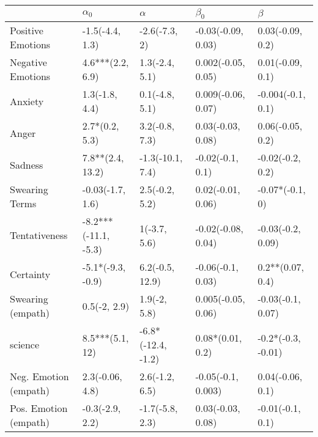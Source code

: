 \begin{tabular}{lllll}
\toprule
{} &            $\alpha_0$ &            $\alpha$ &           $\beta_0$ &             $\beta$ \\
\midrule
Positive Emotions     &       -1.5(-4.4, 1.3) &       -2.6(-7.3, 2) &  -0.03(-0.09, 0.03) &    0.03(-0.09, 0.2) \\
Negative Emotions     &      4.6***(2.2, 6.9) &      1.3(-2.4, 5.1) &  0.002(-0.05, 0.05) &    0.01(-0.09, 0.1) \\
Anxiety               &        1.3(-1.8, 4.4) &      0.1(-4.8, 5.1) &  0.009(-0.06, 0.07) &   -0.004(-0.1, 0.1) \\
Anger                 &        2.7*(0.2, 5.3) &      3.2(-0.8, 7.3) &   0.03(-0.03, 0.08) &    0.06(-0.05, 0.2) \\
Sadness               &      7.8**(2.4, 13.2) &    -1.3(-10.1, 7.4) &    -0.02(-0.1, 0.1) &    -0.02(-0.2, 0.2) \\
Swearing Terms        &      -0.03(-1.7, 1.6) &      2.5(-0.2, 5.2) &   0.02(-0.01, 0.06) &     -0.07*(-0.1, 0) \\
Tentativeness         &  -8.2***(-11.1, -5.3) &        1(-3.7, 5.6) &  -0.02(-0.08, 0.04) &   -0.03(-0.2, 0.09) \\
Certainty             &     -5.1*(-9.3, -0.9) &     6.2(-0.5, 12.9) &   -0.06(-0.1, 0.03) &    0.2**(0.07, 0.4) \\
Swearing (empath)     &          0.5(-2, 2.9) &        1.9(-2, 5.8) &  0.005(-0.05, 0.06) &   -0.03(-0.1, 0.07) \\
science               &       8.5***(5.1, 12) &  -6.8*(-12.4, -1.2) &    0.08*(0.01, 0.2) &  -0.2*(-0.3, -0.01) \\
Neg. Emotion (empath) &       2.3(-0.06, 4.8) &      2.6(-1.2, 6.5) &  -0.05(-0.1, 0.003) &    0.04(-0.06, 0.1) \\
Pos. Emotion (empath) &       -0.3(-2.9, 2.2) &     -1.7(-5.8, 2.3) &   0.03(-0.03, 0.08) &    -0.01(-0.1, 0.1) \\
\bottomrule
\end{tabular}
